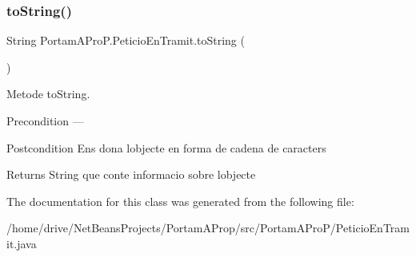 \subsubsection{\texorpdfstring{to\+String()}{toString()}}
{\footnotesize\ttfamily String Portam\+A\+Pro\+P.\+Peticio\+En\+Tramit.\+to\+String (\begin{DoxyParamCaption}{ }\end{DoxyParamCaption})}



Metode to\+String. 

\begin{DoxyPrecond}{Precondition}
--- 
\end{DoxyPrecond}
\begin{DoxyPostcond}{Postcondition}
Ens dona l\textquotesingle{}objecte en forma de cadena de caracters 
\end{DoxyPostcond}
\begin{DoxyReturn}{Returns}
String que conte informacio sobre l\textquotesingle{}objecte 
\end{DoxyReturn}


The documentation for this class was generated from the following file\+:\begin{DoxyCompactItemize}
\item 
/home/drive/\+Net\+Beans\+Projects/\+Portam\+A\+Prop/src/\+Portam\+A\+Pro\+P/Peticio\+En\+Tramit.\+java\end{DoxyCompactItemize}
